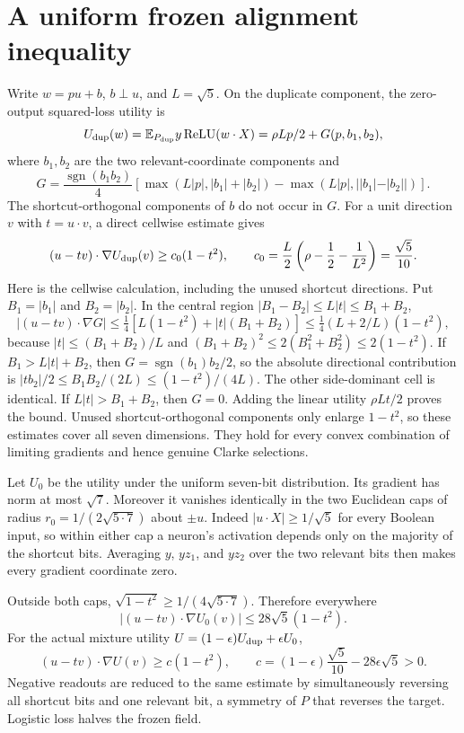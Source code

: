 \documentclass[11pt]{article}
\newcommand{\E}{\mathbb E}\newcommand{\R}{\mathbb R}
\begin{document}
\section{A uniform frozen alignment inequality}
Write $w=pu+b$, $b\perp u$, and $L=\sqrt5$. On the duplicate component,
the zero-output squared-loss utility is
\[
 U_{\rm dup}(w)=\E_{P_{\rm dup}}y\operatorname{ReLU}(w\cdot X)
               =\rho Lp/2+G(p,b_1,b_2),
\]
where $b_1,b_2$ are the two relevant-coordinate components and
\[
 G=\frac{\operatorname{sgn}(b_1b_2)}4
 [\max(L|p|,|b_1|+|b_2|)-\max(L|p|,||b_1|-|b_2||)].
\]
The shortcut-orthogonal components of $b$ do not occur in $G$.
For a unit direction $v$ with $t=u\cdot v$, a direct cellwise estimate gives
\[
 (u-tv)\cdot\nabla U_{\rm dup}(v)
 \ge c_0(1-t^2),\qquad
 c_0=\frac L2\left(\rho-\frac12-\frac1{L^2}\right)=\frac{\sqrt5}{10}.
\]
Here is the cellwise calculation, including the unused shortcut directions.
Put $B_1=|b_1|$ and $B_2=|b_2|$. In the central region
$|B_1-B_2|\le L|t|\le B_1+B_2$,
\[
 |(u-tv)\cdot\nabla G|
 \le\tfrac14[L(1-t^2)+|t|(B_1+B_2)]
 \le\tfrac14(L+2/L)(1-t^2),
\]
because $|t|\le(B_1+B_2)/L$ and
$(B_1+B_2)^2\le2(B_1^2+B_2^2)\le2(1-t^2)$.
If $B_1>L|t|+B_2$, then $G=\operatorname{sgn}(b_1)b_2/2$,
so the absolute directional contribution is
$|tb_2|/2\le B_1B_2/(2L)\le(1-t^2)/(4L)$.
The other side-dominant cell is identical. If $L|t|>B_1+B_2$,
then $G=0$. Adding the linear utility $\rho Lt/2$ proves the bound.
Unused shortcut-orthogonal components only enlarge $1-t^2$, so these
estimates cover all seven dimensions. They hold for every convex
combination of limiting gradients and hence genuine Clarke selections.

Let $U_0$ be the utility under the uniform seven-bit distribution.
Its gradient has norm at most $\sqrt7$. Moreover it vanishes identically
in the two Euclidean caps of radius
$r_0=1/(2\sqrt{5\cdot7})$ about $\pm u$. Indeed
$|u\cdot X|\ge1/\sqrt5$ for every Boolean input, so within either cap
a neuron's activation depends only on the majority of the shortcut
bits. Averaging $y$, $yz_1$, and $yz_2$ over the two relevant bits then
makes every gradient coordinate zero.

Outside both caps,
$\sqrt{1-t^2}\ge1/(4\sqrt{5\cdot7})$. Therefore everywhere
\[
 |(u-tv)\cdot\nabla U_0(v)|\le28\sqrt5(1-t^2).
\]
For the actual mixture utility $U=(1-\epsilon)U_{\rm dup}+\epsilon U_0$,
\[
 (u-tv)\cdot\nabla U(v)
 \ge c(1-t^2),\qquad
 c=(1-\epsilon)\frac{\sqrt5}{10}-28\epsilon\sqrt5>0.\tag{A}
\]
Negative readouts are reduced to the same estimate by simultaneously
reversing all shortcut bits and one relevant bit, a symmetry of $P$
that reverses the target. Logistic loss halves the frozen field.
\end{document}
